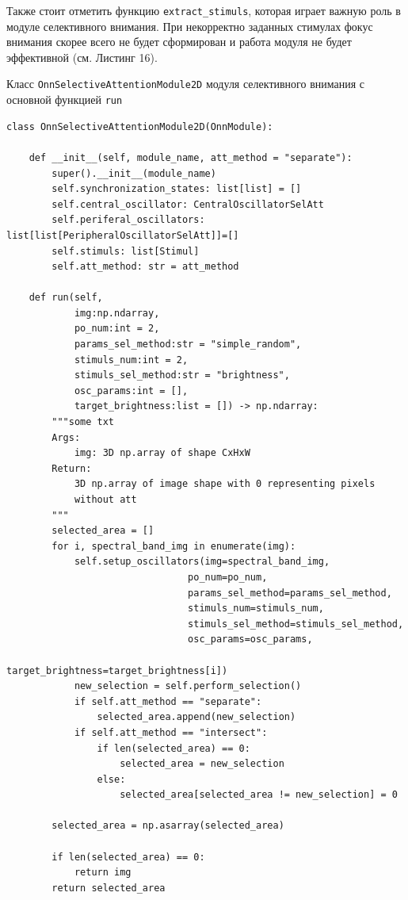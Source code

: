 \documentclass[14pt, russian]{scrartcl}
\begin{document}
Также стоит отметить функцию \texttt{extract\_stimuls}, которая играет важную роль в модуле селективного внимания. При некорректно заданных 
стимулах фокус внимания скорее всего не будет сформирован и работа модуля не будет эффективной (см. Листинг 16).

\begin{listing}[!htt]
    \caption{Класс \texttt{OnnSelectiveAttentionModule2D} модуля селективного внимания с основной функцией \texttt{run}}
    \label{lst:hyp_data}
    \begin{verbatim}
class OnnSelectiveAttentionModule2D(OnnModule):

    def __init__(self, module_name, att_method = "separate"):
        super().__init__(module_name)
        self.synchronization_states: list[list] = []
        self.central_oscillator: CentralOscillatorSelAtt
        self.periferal_oscillators: list[list[PeripheralOscillatorSelAtt]]=[]
        self.stimuls: list[Stimul]
        self.att_method: str = att_method

    def run(self, 
            img:np.ndarray, 
            po_num:int = 2, 
            params_sel_method:str = "simple_random",
            stimuls_num:int = 2,
            stimuls_sel_method:str = "brightness",
            osc_params:int = [],
            target_brightness:list = []) -> np.ndarray:
        """some txt
        Args:
            img: 3D np.array of shape CxHxW
        Return:
            3D np.array of image shape with 0 representing pixels 
            without att
        """
        selected_area = []
        for i, spectral_band_img in enumerate(img):
            self.setup_oscillators(img=spectral_band_img, 
                                po_num=po_num, 
                                params_sel_method=params_sel_method,
                                stimuls_num=stimuls_num,
                                stimuls_sel_method=stimuls_sel_method,
                                osc_params=osc_params,
                                target_brightness=target_brightness[i])
            new_selection = self.perform_selection()
            if self.att_method == "separate":
                selected_area.append(new_selection)
            if self.att_method == "intersect":
                if len(selected_area) == 0:
                    selected_area = new_selection
                else:
                    selected_area[selected_area != new_selection] = 0

        selected_area = np.asarray(selected_area)

        if len(selected_area) == 0:
            return img
        return selected_area
    \end{verbatim}
\end{listing}
\end{document}
